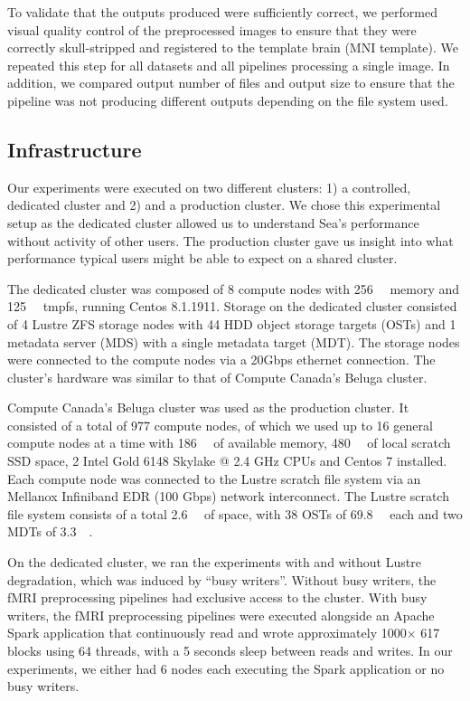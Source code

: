 \documentclass[fleqn,10pt]{wlscirep}
\begin{document}
    To validate that the outputs produced were sufficiently correct, we
    performed visual quality control of the preprocessed images to ensure that
    they were correctly skull-stripped and registered to the template brain (MNI
    template). We repeated this step for all datasets and all pipelines
    processing a single image. In addition, we compared output number of files
    and output size to ensure that the pipeline was not producing different
    outputs depending on the file system used.
    
    
    \subsection{Infrastructure}
    
    Our experiments were executed on two different clusters: 1) a controlled, dedicated cluster
    and 2) and a production cluster. We chose this experimental setup as the dedicated
    cluster allowed us to understand Sea's performance without activity of other users.
    The production cluster gave us insight into what performance typical users might
    be able to expect on a shared cluster.

    The dedicated cluster was composed of 8
    compute nodes with \SI{256}{\gibi\byte} memory and \SI{125}{\gibi\byte}
    tmpfs, running Centos 8.1.1911.
    Storage on the dedicated cluster consisted of 4 Lustre ZFS storage nodes with 44
    HDD object storage targets (OSTs) and 1 metadata server (MDS) with a single
    metadata target (MDT). The storage nodes were connected to the compute nodes
    via a 20Gbps ethernet connection. The cluster's hardware was similar to that
    of Compute Canada's Beluga cluster.
    
    Compute Canada's Beluga cluster was used as the production cluster.
    It consisted of a total of 977 compute nodes, of which we
    used up to 16 general compute nodes at a time with \SI{186}{\gibi\byte} of
    available memory, \SI{480}{\gibi\byte} of local scratch SSD space, 2 Intel
    Gold 6148 Skylake @ 2.4 GHz CPUs and Centos 7 installed. Each compute node
    was connected to the Lustre scratch file system via an Mellanox Infiniband
    EDR (100 Gbps) network interconnect. The Lustre scratch file system consists
    of a total \SI{2.6}{\pebi\byte} of space, with 38 OSTs of
    \SI{69.8}{\tebi\byte} each and two MDTs of \SI{3.3}{\tebi\byte}.

    On the dedicated cluster, we ran the experiments with and without
    Lustre degradation, which was induced by ``busy writers''. Without busy
    writers, the fMRI preprocessing pipelines had exclusive access to the
    cluster. With busy writers, the fMRI preprocessing pipelines were executed
    alongside an Apache Spark application that continuously read and wrote approximately
    1000$\times$ \SI{617}{\mebi\byte} blocks using 64 threads, with a 5 seconds sleep between reads
    and writes. In our experiments, we either had 6 nodes each executing the
    Spark application or no busy writers.
\end{document}
